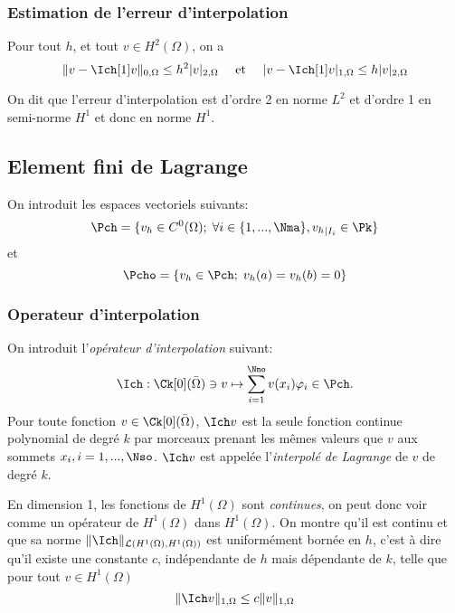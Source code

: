 \subsubsection{Estimation de l'erreur d'interpolation}
\label{sec:estim-de-lerr}

\begin{proposition}
  \label{prop:5}
  Pour tout $h$, et tout $v \in H^2(\Omega)$, on a
  \begin{equation}
    \label{eq:23}
    \|v - \Ich[1] v\|_{0,\Omega} \leq h^2 |v|_{2,\Omega}\quad \mbox{ et }\quad |v - \Ich[1] v|_{1,\Omega} \leq h |v|_{2,\Omega}
  \end{equation}
\end{proposition}

On dit que l'erreur d'interpolation est d'ordre 2 en norme $L^2$ et d'ordre 1
en semi-norme $H^1$ et donc en norme $H^1$.


\subsection{Element fini de Lagrange \Pk}
\label{sec:element-fini-de-1}

On introduit les espaces vectoriels suivants:
\begin{equation}
  \label{eq:9}
  \Pch = \{ v_h \in C^0(\Omega);\; \forall i \in \{ 1,...,\Nma\}, {v_h}_{|I_i} \in \Pk\}
\end{equation}
et
\begin{equation}
  \label{eq:10}
  \Pcho = \{ v_h \in \Pch;\; v_h(a)=v_h(b)=0 \}
\end{equation}

\subsubsection{Operateur d'interpolation}
\label{sec:oper-dint}

On introduit l'\emph{opérateur d'interpolation} suivant:
\begin{equation}
  \label{eq:24}
    \Ich : \Ck[0](\bar{\Omega}) \ni v \mapsto \sum_{i=1}^\Nno v(x_i)  \varphi_i \in \Pch.
\end{equation}
Pour toute fonction $v \in \Ck[0](\bar{\Omega})$, $\Ich v$ est la seule
fonction continue polynomial de degré $k$ par morceaux prenant les mêmes
valeurs que $v$ aux sommets $x_i, i=1,...,\Nso$. $\Ich v$ est appelée
l'\emph{interpolé de Lagrange} de $v$ de degré $k$.

\begin{remark}
  \label{rem:9}
  En dimension 1, les fonctions de $H^1(\Omega)$ sont \emph{continues}, on
  peut donc voir \Ich comme un opérateur de $H^1(\Omega)$ dans
  $H^1(\Omega)$. On montre qu'il est continu et que sa norme
  $\|\Ich\|_{\mathcal{L}(H^1(\Omega),H^1(\Omega))}$ est uniformément bornée en
  $h$, c'est à dire qu'il existe une constante $c$, indépendante de $h$ mais
  dépendante de $k$, telle
  que pour tout $v \in H^1(\Omega)$
  \begin{equation}
    \label{eq:25}
    \|\Ich v \|_{1,\Omega} \leq c \|v\|_{1,\Omega}
  \end{equation}
\end{remark}


